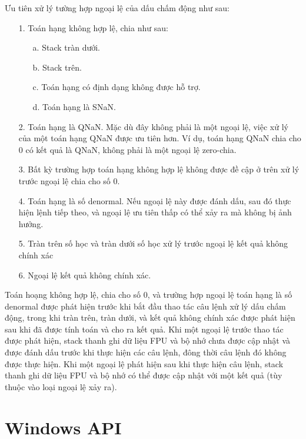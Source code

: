 		Ưu tiên xử lý tường hợp ngoại lệ của dấu chấm động như sau:
		\begin{itemize}
			\item[1.] Toán hạng không hợp lệ, chia như sau:
				\begin{itemize}
					\item[a.] Stack tràn dưới.
					\item[b.] Stack trên.
					\item[c.] Toán hạng có định dạng không được hỗ trợ.
					\item[d.] Toán hạng là SNaN.
				\end{itemize}
			\item[2.]		Toán hạng là QNaN. Mặc dù đây không phải là một ngoại lệ, việc xử lý của một toán hạng QNaN được ưu tiên hơn. Ví dụ, toán hạng QNaN chia cho 0 có kết quả là QNaN, không phải là một ngoại lệ zero-chia.
			\item[3.]		 Bất kỳ trường hợp toán hạng không hợp lệ không được đề cập ở trên xử lý trước ngoại lệ chia cho số 0.
			\item[4.]		Toán hạng là số denormal. Nếu ngoại lệ này được đánh dấu, sau đó thực hiện lệnh tiếp theo, và ngoại lệ ưu tiên thấp có thể xảy ra mà không bị ảnh hưởng.
			\item[5.]		Tràn trên số học và tràn dưới số học xử lý trước ngoại lệ kết quả không chính xác
			\item[6.]		Ngoại lệ kết quả không chính xác.
		\end{itemize}

	Toán hoạng không hợp lệ, chia cho số 0, và trường hợp ngoại lệ toán hạng là số denormal được phát hiện trước khi bắt đầu thao tác câu lệnh xử lý dấu chấm động, trong khi tràn trên, tràn dưới, và kết quả không chính xác được phát hiện sau khi đã được tính toán và cho ra kết quả. Khi một ngoại lệ trước thao tác được phát hiện, stack thanh ghi dữ liệu FPU và bộ nhớ chưa được cập nhật và được đánh dấu trước khi thực hiện các câu lệnh, đông thời câu lệnh đó không được thực hiện. Khi một ngoại lệ phát hiện sau khi thực hiện câu lệnh, stack thanh ghi dữ liệu FPU và bộ nhớ có thể được cập nhật với một kết quả (tùy thuộc vào loại ngoại lệ xảy ra).





		
	

\section{Windows API}

